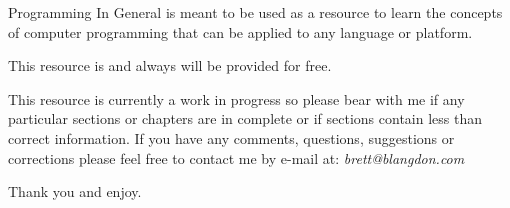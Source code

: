 Programming In General is meant to be used as a resource to learn the concepts of computer programming that can be applied to any
language or platform.
\par

This resource is and always will be provided for free.
\par

This resource is currently a work in progress so please bear with me if any particular sections or chapters are in complete or
if sections contain less than correct information.
If you have any comments, questions, suggestions or corrections please feel free to contact me by e-mail at: \emph{brett@blangdon.com}
\\
\par
Thank you and enjoy.

